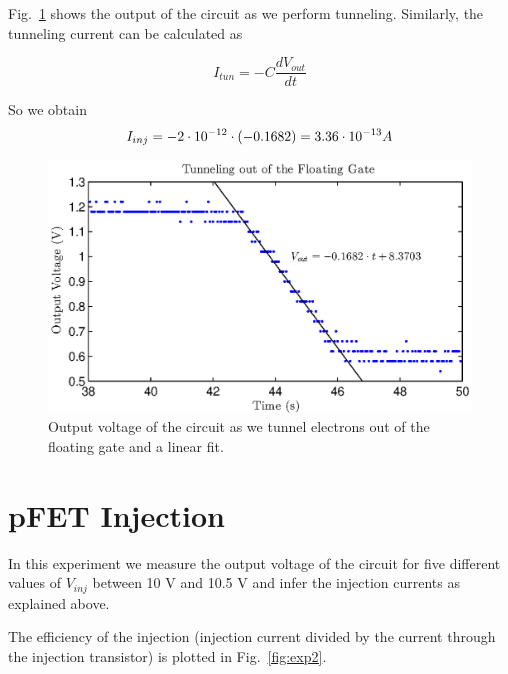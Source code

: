 Fig.~\ref{fig:exp1b} shows the output of the circuit as we perform tunneling. Similarly, the tunneling current can be calculated as

\begin{equation*}
	I_{tun} = -C\frac{dV_{out}}{dt}
\end{equation*}

So we obtain 
\begin{equation*}
	I_{inj}=-2\cdot10^{-12}\cdot(-0.1682) = 3.36\cdot10^{-13} A\\
\end{equation*}

\begin{figure}[!h]
	\center
	\includegraphics{exp1b.eps}
	\caption{Output voltage of the circuit as we tunnel electrons out of the floating gate and a linear fit.}
	\label{fig:exp1b}
\end{figure}

\section{pFET Injection}

In this experiment we measure the output voltage of the circuit for five different values of $V_{inj}$ between 10 V and 10.5 V and infer the injection currents as explained above. 

The efficiency of the injection (injection current divided by the current through the injection transistor) is plotted in Fig.~\ref{fig:exp2}.

